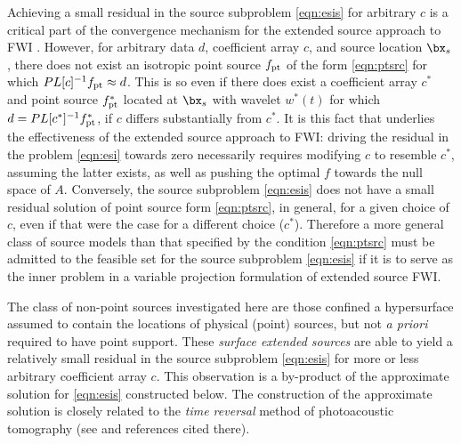 
Achieving a small residual in the source subproblem \ref{eqn:esis} for arbitrary $c$ is a critical part of the convergence mechanism for the extended source approach to FWI \cite[]{HuangNammourSymesDollizal:SEG19}. However, for arbitrary data $d$, coefficient array $c$, and source location $\bx_s$, there does not exist an isotropic point source $f_{\rm pt}$ of the form \ref{eqn:ptsrc} for which $PL[c]^{-1}f_{\rm pt} \approx d$. This is so even if there does exist a coefficient array $c^*$ and point source $f_{\rm pt}^*$ located at $\bx_s$ with wavelet $w^*(t)$ for which $d = PL[c^*]^{-1}f_{\rm pt}^*$, if $c$ differs substantially from $c^*$. It is this fact that underlies the effectiveness of the extended source approach to FWI:  driving the residual in the problem \ref{eqn:esi} towards zero necessarily requires modifying $c$ to resemble $c^*$, assuming the latter exists, as well as pushing the optimal $f$ towards the null space of $A$. Conversely, the source subproblem \ref{eqn:esis} does not have a small residual solution of point source form \ref{eqn:ptsrc}, in general, for a given choice of $c$, even if that were the case for a different choice ($c^*$). Therefore a more general class of source models than that specified by the condition \ref{eqn:ptsrc} must be admitted to the feasible set for the source subproblem \ref{eqn:esis} if it is to serve as the inner problem in a variable projection formulation of extended source FWI.

The class of non-point sources investigated here are those confined a hypersurface assumed to contain the locations of physical (point) sources, but not {\em a priori} required to have point support. These {\em surface extended sources} are able to yield a relatively small residual in the source subproblem \ref{eqn:esis} for more or less arbitrary coefficient array $c$. This observation is a by-product of the approximate solution for \ref{eqn:esis} constructed below. The construction of the approximate solution is closely related to the {\em time reversal} method of photoacoustic tomography (see \cite{StefanovUhlmannIP:09} and references cited there).

